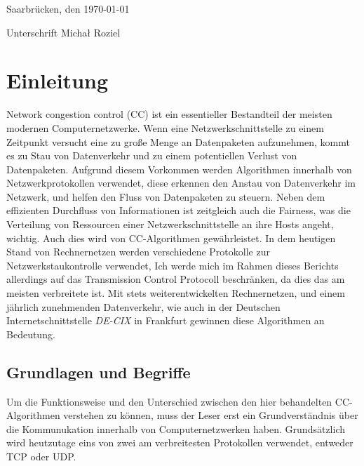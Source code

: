 \documentclass[paper=a4,fontsize=12pt,ngerman]{scrartcl}
\begin{document}
Saarbrücken, den \today

\smallskip
Unterschrift  Micha\l{} Roziel




\clearpage
\tableofcontents 

\clearpage
{}



\section{Einleitung}

Network congestion control (CC) ist ein essentieller Bestandteil der 
meisten modernen Computernetzwerke. 
Wenn eine Netzwerkschnittstelle zu einem Zeitpunkt versucht eine zu große Menge an Datenpaketen aufzunehmen,
kommt es zu Stau von Datenverkehr und zu einem potentiellen Verlust von Datenpaketen.
Aufgrund diesem Vorkommen werden Algorithmen innerhalb von Netzwerkprotokollen verwendet, diese erkennen den Anstau von Datenverkehr im Netzwerk,
und helfen den Fluss von Datenpaketen zu steuern. Neben dem effizienten Durchfluss von Informationen ist zeitgleich auch die Fairness, 
was die Verteilung von Ressourcen einer Netzwerkschnittstelle an ihre Hosts angeht, wichtig. Auch dies wird von CC-Algorithmen gewährleistet.
In dem heutigen Stand von Rechnernetzen werden verschiedene Protokolle zur Netzwerkstaukontrolle verwendet, 
Ich werde mich im Rahmen dieses Berichts allerdings auf das Transmission Control Protocoll beschränken, da dies das am meisten verbreitete ist.  \newline
\newline
Mit stets weiterentwickelten Rechnernetzen, und einem jährlich zunehmenden Datenverkehr, wie auch in der Deutschen Internetschnittstelle
\textit{DE-CIX}\cite{DE-CIX2025} in Frankfurt gewinnen diese Algorithmen an Bedeutung. 






\subsection{Grundlagen und Begriffe}
Um die Funktionsweise und den Unterschied zwischen den hier behandelten CC-Algorithmen verstehen zu können, muss der Leser erst ein Grundverständnis über die Kommunukation innerhalb von Computernetzwerken haben.
Grundsätzlich wird heutzutage eins von zwei am verbreitesten Protokollen verwendet, entweder 
TCP oder UDP. 
\end{document}
